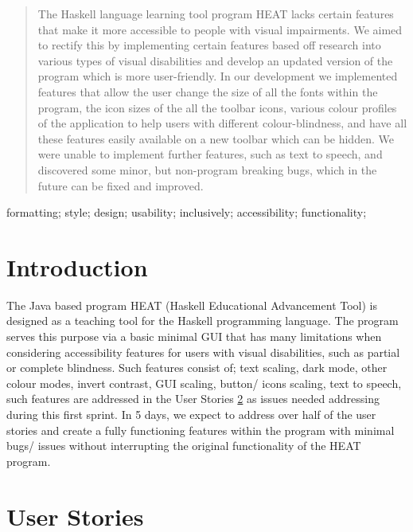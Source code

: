 \begin{abstract}
The Haskell language learning tool program HEAT lacks certain features that make it more accessible to people with visual impairments. We aimed to rectify this by implementing certain features based off research into various types of visual disabilities and develop an updated version of the program which is more user-friendly. In our development we implemented features that allow the user change the size of all the fonts within the program, the icon sizes of the all the toolbar icons, various colour profiles of the application to help users with different colour-blindness, and have all these features easily available on a new toolbar which can be hidden. We were unable to implement further features, such as text to speech, and discovered some minor, but non-program breaking bugs, which in the future can be fixed and improved.


\end{abstract}

\begin{IEEEkeywords}
formatting; style; design; usability; inclusively; accessibility; functionality;
\end{IEEEkeywords}

\section{\textbf{Introduction}}
\label{Intorduction}

The Java based program HEAT (Haskell Educational Advancement Tool) \cite{IEEEexample:HEATatKent} is designed as a teaching tool for the Haskell programming language. The program serves this purpose via a basic minimal GUI that has many limitations when considering accessibility features for users with visual disabilities, such as partial or complete blindness. Such features consist of; text scaling, dark mode, other colour modes, invert contrast, GUI scaling, button/ icons scaling, text to speech, such features are addressed in the User Stories \ref{UserStories} as issues needed addressing during this first sprint. In 5 days, we expect to address over half of the user stories and create a fully functioning features within the program with minimal bugs/ issues without interrupting the original functionality of the HEAT program.

\section{\textbf{User Stories}}
\label{UserStories}

